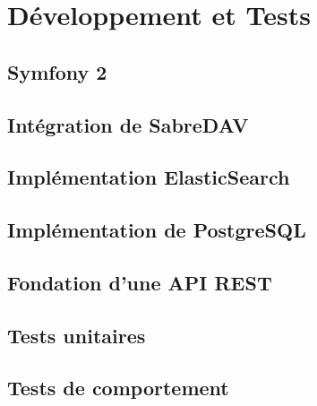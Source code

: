 \section{Développement et Tests}

\subsection{Symfony 2}

\subsection{Intégration de SabreDAV}

\subsection{Implémentation ElasticSearch}

\subsection{Implémentation de PostgreSQL}

\subsection{Fondation d'une API REST}


\subsection{Tests unitaires}

\subsection{Tests de comportement}